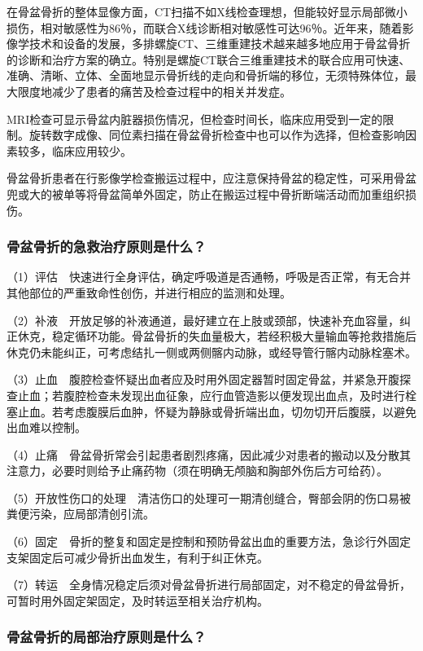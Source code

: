 在骨盆骨折的整体显像方面，CT扫描不如X线检查理想，但能较好显示局部微小损伤，相对敏感性为86％，而联合X线诊断相对敏感性可达96％。近年来，随着影像学技术和设备的发展，多排螺旋CT、三维重建技术越来越多地应用于骨盆骨折的诊断和治疗方案的确立。特别是螺旋CT联合三维重建技术的联合应用可快速、准确、清晰、立体、全面地显示骨折线的走向和骨折端的移位，无须特殊体位，最大限度地减少了患者的痛苦及检查过程中的相关并发症。

MRI检查可显示骨盆内脏器损伤情况，但检查时间长，临床应用受到一定的限制。旋转数字成像、同位素扫描在骨盆骨折检查中也可以作为选择，但检查影响因素较多，临床应用较少。

骨盆骨折患者在行影像学检查搬运过程中，应注意保持骨盆的稳定性，可采用骨盆兜或大的被单等将骨盆简单外固定，防止在搬运过程中骨折断端活动而加重组织损伤。

\subsubsection{骨盆骨折的急救治疗原则是什么？}

（1）评估　快速进行全身评估，确定呼吸道是否通畅，呼吸是否正常，有无合并其他部位的严重致命性创伤，并进行相应的监测和处理。

（2）补液　开放足够的补液通道，最好建立在上肢或颈部，快速补充血容量，纠正休克，稳定循环功能。骨盆骨折的失血量极大，若经积极大量输血等抢救措施后休克仍未能纠正，可考虑结扎一侧或两侧髂内动脉，或经导管行髂内动脉栓塞术。

（3）止血　腹腔检查怀疑出血者应及时用外固定器暂时固定骨盆，并紧急开腹探查止血；若腹腔检查未发现出血征象，应行血管造影以便发现出血点，及时进行栓塞止血。若考虑腹膜后血肿，怀疑为静脉或骨折端出血，切勿切开后腹膜，以避免出血难以控制。

（4）止痛　骨盆骨折常会引起患者剧烈疼痛，因此减少对患者的搬动以及分散其注意力，必要时则给予止痛药物（须在明确无颅脑和胸部外伤后方可给药）。

（5）开放性伤口的处理　清洁伤口的处理可一期清创缝合，臀部会阴的伤口易被粪便污染，应局部清创引流。

（6）固定　骨折的整复和固定是控制和预防骨盆出血的重要方法，急诊行外固定支架固定后可减少骨折出血发生，有利于纠正休克。

（7）转运　全身情况稳定后须对骨盆骨折进行局部固定，对不稳定的骨盆骨折，可暂时用外固定架固定，及时转运至相关治疗机构。

\subsubsection{骨盆骨折的局部治疗原则是什么？}

